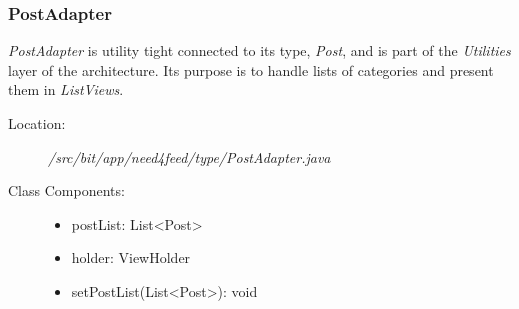 \subsubsection{PostAdapter}
\textit{PostAdapter} is utility tight connected to its type, \textit{Post}, and is part of the \textit{Utilities} layer of the architecture. Its purpose is to handle lists of categories and present them in \textit{ListViews}.
\begin{description}
  \item[Location:] \textit{/src/bit/app/need4feed/type/PostAdapter.java} \hfill
  \item[Class Components:] \hfill
     \begin{itemize}
        \item postList: List\textless Post\textgreater
        \item holder: ViewHolder
		\item setPostList(List\textless Post\textgreater): void 
     \end{itemize}
\end{description}
